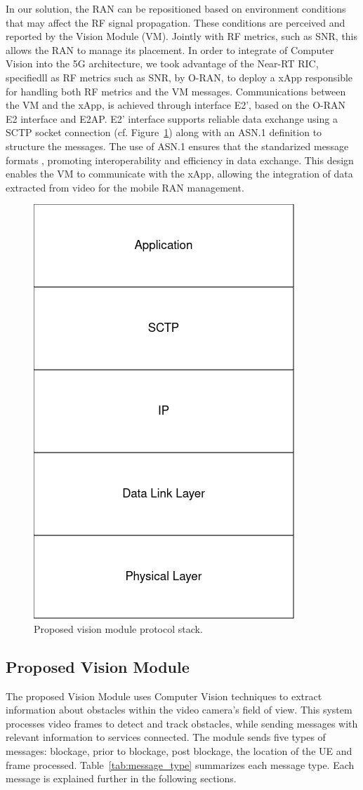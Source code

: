 In our solution, the RAN can be repositioned based on environment conditions that may affect the RF signal propagation\@.
These conditions are perceived and reported by the Vision Module (VM).
Jointly with RF metrics, such as SNR, this allows the RAN to manage its placement.
In order to integrate of Computer Vision into the 5G architecture, we took advantage of the Near-RT RIC, specifiedll as RF metrics such as SNR, by O-RAN, to deploy a xApp responsible for handling both RF metrics and the VM messages.
Communications between the VM and the xApp, is achieved through interface E2', based on the O-RAN E2 interface and E2AP\@.
E2' interface supports reliable data exchange using a SCTP socket connection (cf.
Figure~\ref{fig:stack}) along with an ASN.1 definition to structure the messages.
The use of ASN.1 ensures that the standarized message formats , promoting interoperability and efficiency in data exchange.
This design enables the VM to communicate with the xApp, allowing the integration of data extracted from video for the mobile RAN management.

\begin{figure}[H]
    \centering
    \includegraphics[width=0.2\linewidth]{figures/VisionModule_ProtocolStack.drawio(2)}
    \caption[Proposed Vision Module Protocol Stack]{Proposed vision module protocol stack.}
    \label{fig:stack}
\end{figure}


\subsection{Proposed Vision Module}\label{subsec:prop_vision}
The proposed Vision Module uses Computer Vision techniques to extract information about obstacles within the video camera's field of view.
This system processes video frames to detect and track obstacles, while sending messages with relevant information to services connected.
The module sends five types of messages: blockage, prior to blockage, post blockage, the location of the UE and frame processed.
Table~\ref{tab:message_type} summarizes each message type.
Each message is explained further in the following sections.

